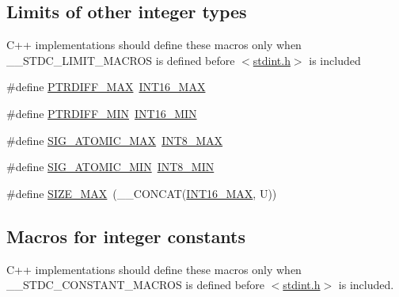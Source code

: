 \subsection*{Limits of other integer types}
\label{_amgrp9984b0713e1f5c3fda339ad15323de94}%
C++ implementations should define these macros only when \+\_\+\+\_\+\+S\+T\+D\+C\+\_\+\+L\+I\+M\+I\+T\+\_\+\+M\+A\+C\+R\+OS is defined before $<$\hyperlink{stdint_8h}{stdint.\+h}$>$ is included \begin{DoxyCompactItemize}
\item 
\#define \hyperlink{group__avr__stdint_gadd2ef7bffac19cfdd1f4b5495409672f}{P\+T\+R\+D\+I\+F\+F\+\_\+\+M\+AX}~\hyperlink{group__avr__stdint_gac58f2c111cc9989c86db2a7dc4fd84ca}{I\+N\+T16\+\_\+\+M\+AX}
\item 
\#define \hyperlink{group__avr__stdint_gad9b88ba2fb858f98b50b38e49875d90e}{P\+T\+R\+D\+I\+F\+F\+\_\+\+M\+IN}~\hyperlink{group__avr__stdint_gad4e9955955b27624963643eac448118a}{I\+N\+T16\+\_\+\+M\+IN}
\item 
\#define \hyperlink{group__avr__stdint_ga1f5fe9445d0ad0bee21bab1de4cc3e58}{S\+I\+G\+\_\+\+A\+T\+O\+M\+I\+C\+\_\+\+M\+AX}~\hyperlink{group__avr__stdint_gaaf7f29f45f1a513b4748a4e5014ddf6a}{I\+N\+T8\+\_\+\+M\+AX}
\item 
\#define \hyperlink{group__avr__stdint_ga21e605b9ac3a03b6de93cdf5a69e129f}{S\+I\+G\+\_\+\+A\+T\+O\+M\+I\+C\+\_\+\+M\+IN}~\hyperlink{group__avr__stdint_gaadcf2a81af243df333b31efa6461ab8e}{I\+N\+T8\+\_\+\+M\+IN}
\item 
\#define \hyperlink{group__avr__stdint_ga3c75bb398badb69c7577b21486f9963f}{S\+I\+Z\+E\+\_\+\+M\+AX}~(\+\_\+\+\_\+\+C\+O\+N\+C\+AT(\hyperlink{group__avr__stdint_gac58f2c111cc9989c86db2a7dc4fd84ca}{I\+N\+T16\+\_\+\+M\+AX}, U))
\end{DoxyCompactItemize}
\subsection*{Macros for integer constants}
\label{_amgrp7245dc5f9df3601bffee6d6bc1eb6a98}%
C++ implementations should define these macros only when \+\_\+\+\_\+\+S\+T\+D\+C\+\_\+\+C\+O\+N\+S\+T\+A\+N\+T\+\_\+\+M\+A\+C\+R\+OS is defined before $<$\hyperlink{stdint_8h}{stdint.\+h}$>$ is included.


